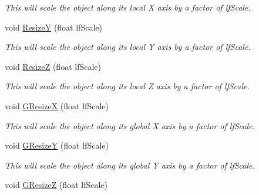 \begin{DoxyCompactItemize}
\begin{DoxyCompactList}\small\item\em This will scale the object along its local X axis by a factor of lfScale. \end{DoxyCompactList}\item 
\hypertarget{classc_matrix4_a77ef7c3392fd4d02ddfa4d206f91265b}{
void \hyperlink{classc_matrix4_a77ef7c3392fd4d02ddfa4d206f91265b}{ResizeY} (float lfScale)}
\label{classc_matrix4_a77ef7c3392fd4d02ddfa4d206f91265b}

\begin{DoxyCompactList}\small\item\em This will scale the object along its local Y axis by a factor of lfScale. \end{DoxyCompactList}\item 
\hypertarget{classc_matrix4_ac2789d9134f4b599f3f79f7b89c05af1}{
void \hyperlink{classc_matrix4_ac2789d9134f4b599f3f79f7b89c05af1}{ResizeZ} (float lfScale)}
\label{classc_matrix4_ac2789d9134f4b599f3f79f7b89c05af1}

\begin{DoxyCompactList}\small\item\em This will scale the object along its local Z axis by a factor of lfScale. \end{DoxyCompactList}\item 
\hypertarget{classc_matrix4_ac2be3e4653b0c8324c6a505e54544043}{
void \hyperlink{classc_matrix4_ac2be3e4653b0c8324c6a505e54544043}{GResizeX} (float lfScale)}
\label{classc_matrix4_ac2be3e4653b0c8324c6a505e54544043}

\begin{DoxyCompactList}\small\item\em This will scale the object along its global X axis by a factor of lfScale. \end{DoxyCompactList}\item 
\hypertarget{classc_matrix4_a13fda6e0dc1b19f7f136c1963bbdac77}{
void \hyperlink{classc_matrix4_a13fda6e0dc1b19f7f136c1963bbdac77}{GResizeY} (float lfScale)}
\label{classc_matrix4_a13fda6e0dc1b19f7f136c1963bbdac77}

\begin{DoxyCompactList}\small\item\em This will scale the object along its global Y axis by a factor of lfScale. \end{DoxyCompactList}\item 
\hypertarget{classc_matrix4_a74217e4c12e8f5623a572535ba443bc4}{
void \hyperlink{classc_matrix4_a74217e4c12e8f5623a572535ba443bc4}{GResizeZ} (float lfScale)}
\label{classc_matrix4_a74217e4c12e8f5623a572535ba443bc4}


\end{DoxyCompactItemize}
